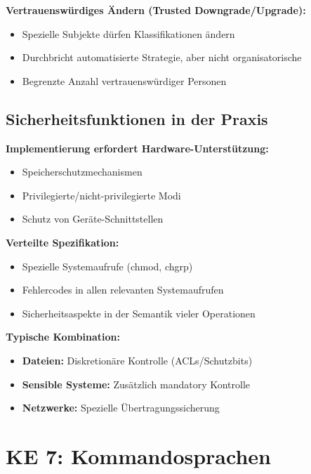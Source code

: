 \documentclass[9pt,a4paper]{extarticle}
\begin{document}
\begin{multicols*}{2}
\textbf{Vertrauenswürdiges Ändern (Trusted Downgrade/Upgrade):}
\begin{itemize}
\item Spezielle Subjekte dürfen Klassifikationen ändern
\item Durchbricht automatisierte Strategie, aber nicht organisatorische
\item Begrenzte Anzahl vertrauenswürdiger Personen
\end{itemize}

\subsection{Sicherheitsfunktionen in der Praxis}
\textbf{Implementierung erfordert Hardware-Unterstützung:}
\begin{itemize}
\item Speicherschutzmechanismen
\item Privilegierte/nicht-privilegierte Modi
\item Schutz von Geräte-Schnittstellen
\end{itemize}

\textbf{Verteilte Spezifikation:}
\begin{itemize}
\item Spezielle Systemaufrufe (chmod, chgrp)
\item Fehlercodes in allen relevanten Systemaufrufen
\item Sicherheitsaspekte in der Semantik vieler Operationen
\end{itemize}

\textbf{Typische Kombination:}
\begin{itemize}
\item \textbf{Dateien:} Diskretionäre Kontrolle (ACLs/Schutzbits)
\item \textbf{Sensible Systeme:} Zusätzlich mandatory Kontrolle
\item \textbf{Netzwerke:} Spezielle Übertragungssicherung
\end{itemize}

\section{KE 7: Kommandosprachen}


\end{multicols*}
\end{document}
